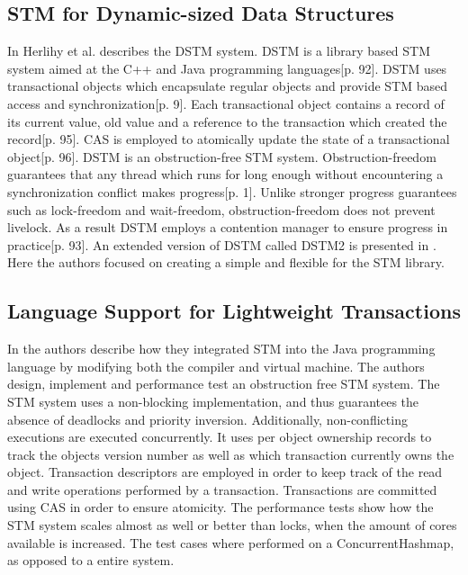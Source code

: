 \subsection{\ac{STM} for Dynamic-sized Data Structures}
In \cite{herlihy2003software} Herlihy et al. describes the \ac{DSTM} system. \ac{DSTM} is a library based \ac{STM} system aimed at the C++ and Java programming languages\cite{herlihy2003software}[p. 92]. \ac{DSTM} uses transactional objects which encapsulate regular objects and provide \ac{STM} based access and synchronization\cite{herlihy2003software}[p. 9]. Each transactional object contains a record of its current value, old value and a reference to the transaction which created the record\cite{herlihy2003software}[p. 95]. \ac{CAS} is employed to atomically update the state of a transactional object\cite{herlihy2003software}[p. 96]. \ac{DSTM} is an obstruction-free\cite{herlihy2003obstruction} \ac{STM} system. Obstruction-freedom guarantees that any thread which runs for long enough without encountering a synchronization conflict makes progress\cite{herlihy2003obstruction}[p. 1]. Unlike stronger progress guarantees such as lock-freedom and wait-freedom, obstruction-freedom does not prevent livelock\cite[p. 47]{harris2010transactional}. As a result \ac{DSTM} employs a contention manager to ensure progress in practice\cite{herlihy2003software}[p. 93]. An extended version of \ac{DSTM} called DSTM2 is presented in \cite{herlihy2006flexible}. Here the authors focused on creating a simple and flexible  for the \ac{STM} library.

\subsection{Language Support for Lightweight Transactions}
In \cite{harris2003language} the authors describe how they integrated \ac{STM} into the Java programming language by modifying both the compiler\cite[p. 4]{harris2003language} and virtual machine\cite[p. 9]{harris2003language}. The authors design, implement and performance test an obstruction free \ac{STM} system. The \ac{STM} system uses a non-blocking implementation, and thus guarantees the absence of deadlocks and priority inversion. Additionally, non-conflicting executions are executed concurrently. It uses per object ownership records to track the objects version number as well as which transaction currently owns the object\cite[p. 6]{harris2003language}. Transaction descriptors are employed in order to keep track of the read and write operations performed by a transaction. Transactions are committed  using \ac{CAS} in order to ensure atomicity\cite[p. 7]{harris2003language}. The performance tests show how the \ac{STM} system scales almost as well or better than locks, when the amount of cores available is increased\cite[p. 12]{harris2003language}. The test cases where performed on a ConcurrentHashmap, as opposed to a entire system.

